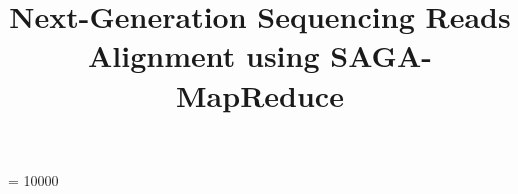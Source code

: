 \documentclass{sig-alternate}
\begin{document}
 {}
\widowpenalty = 10000



\newif\ifdraft

\ifdraft
 \newcommand{\jkimnote}[1]{{\textcolor{green}   { ***Joohyun:   #1 }}}
 \newcommand{\jhanote}[1]{  {\textcolor{red}     { ***SJ: #1 }}}
  \newcommand{\pmnote}[1]{  {\textcolor{red}     { ***Pradeep: #1 }}}
 \newcommand{\todo}[1]{  {\textcolor{red}     { ***TODO: #1 }}}
 \newcommand{\fix}[1]{  {\textcolor{red}     { ***FIX: #1 }}}
 \newcommand{\reviewer}[1]{}
\else
 \newcommand{\reviewer}[1]{}
 \newcommand{\jkimnote}[1]{}
 \newcommand{\pmnote}[1]{}
 \newcommand{\jhanote}[1]{}
 \newcommand{\todo}[1]{  {\textcolor{red}     { ***TODO: #1 }}}
 \newcommand{\fix}[1]{}                                                                                     
\fi

\title{Next-Generation Sequencing Reads Alignment using SAGA-MapReduce}
\end{document}

